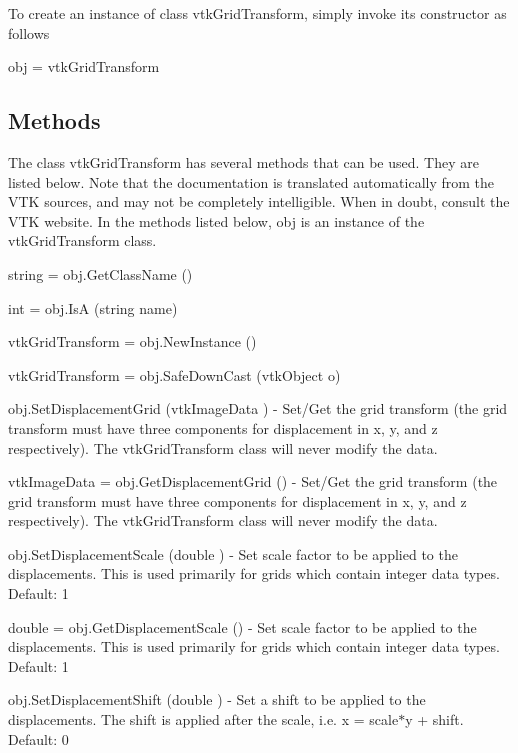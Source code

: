 To create an instance of class vtk\-Grid\-Transform, simply invoke its constructor as follows \begin{DoxyVerb}  obj = vtkGridTransform
\end{DoxyVerb}
 \hypertarget{vtkwidgets_vtkxyplotwidget_Methods}{}\subsection{Methods}\label{vtkwidgets_vtkxyplotwidget_Methods}
The class vtk\-Grid\-Transform has several methods that can be used. They are listed below. Note that the documentation is translated automatically from the V\-T\-K sources, and may not be completely intelligible. When in doubt, consult the V\-T\-K website. In the methods listed below, {\ttfamily obj} is an instance of the vtk\-Grid\-Transform class. 
\begin{DoxyItemize}
\item {\ttfamily string = obj.\-Get\-Class\-Name ()}  
\item {\ttfamily int = obj.\-Is\-A (string name)}  
\item {\ttfamily vtk\-Grid\-Transform = obj.\-New\-Instance ()}  
\item {\ttfamily vtk\-Grid\-Transform = obj.\-Safe\-Down\-Cast (vtk\-Object o)}  
\item {\ttfamily obj.\-Set\-Displacement\-Grid (vtk\-Image\-Data )} -\/ Set/\-Get the grid transform (the grid transform must have three components for displacement in x, y, and z respectively). The vtk\-Grid\-Transform class will never modify the data.  
\item {\ttfamily vtk\-Image\-Data = obj.\-Get\-Displacement\-Grid ()} -\/ Set/\-Get the grid transform (the grid transform must have three components for displacement in x, y, and z respectively). The vtk\-Grid\-Transform class will never modify the data.  
\item {\ttfamily obj.\-Set\-Displacement\-Scale (double )} -\/ Set scale factor to be applied to the displacements. This is used primarily for grids which contain integer data types. Default\-: 1  
\item {\ttfamily double = obj.\-Get\-Displacement\-Scale ()} -\/ Set scale factor to be applied to the displacements. This is used primarily for grids which contain integer data types. Default\-: 1  
\item {\ttfamily obj.\-Set\-Displacement\-Shift (double )} -\/ Set a shift to be applied to the displacements. The shift is applied after the scale, i.\-e. x = scale$\ast$y + shift. Default\-: 0  

\end{DoxyItemize}
